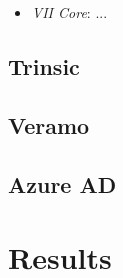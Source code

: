    \begin{itemize}
        \item \textit{VII Core}: ...
    \end{itemize}
    
    \subsection{Trinsic}\label{subsection: trinsic}
    \subsection{Veramo}\label{subsection: veramo}
    \subsection{Azure AD}\label{subsection: azure}
    \section{Results}\label{section: ri-results}